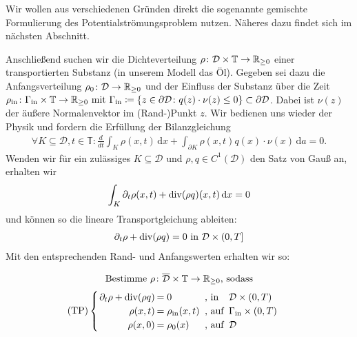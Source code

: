 \begin{Bemerkung}
	Wir wollen aus verschiedenen Gründen direkt die sogenannte gemischte Formulierung des Potentialströmungsproblem nutzen. Näheres dazu findet sich im nächsten Abschnitt.
\end{Bemerkung}
Anschließend suchen wir die Dichteverteilung $\rho\colon \mathcal{D} \times \mathbb{T} \rightarrow \mathbb{R}_{\geq0} $ einer transportierten Substanz (in unserem Modell das Öl).  \newline
Gegeben sei dazu die Anfangsverteilung $\rho_0\colon \mathcal{D} \rightarrow \mathbb{R}_{\geq0}$ und der Einfluss der Substanz über die Zeit
$
\rho_{\text{in}} \colon \Gamma_{\text{in}} \times \mathbb{T} \rightarrow \mathbb{R}_{\geq0} \text{ mit }  \Gamma_{\text{in}} \coloneqq  \{ z \in \partial \mathcal{D}\colon q(z)\cdot \nu(z) \leq 0 \} \subset  \partial \mathcal{D}
$.
Dabei ist $\nu(z)$ der äußere Normalenvektor im (Rand-)Punkt $z$.
Wir bedienen uns wieder der Physik und fordern die Erfüllung der Bilanzgleichung
\begin{align*}
\forall K \subseteq \mathcal{D} , t\in \mathbb{T} \colon \frac{d}{dt} \int_K \rho(x,t) \, \mathrm{d}x + \int_{\partial K} \rho(x,t)q(x)\cdot \nu(x) \, \mathrm{d}a = 0.
\end{align*}
Wenden wir für ein zulässiges $K \subseteq \mathcal{D}$ und $\rho,q \in C^1(\mathcal{D})$ den Satz von Gauß an, erhalten wir
\begin{align*}
\int_K \partial_t \rho(x,t) + \operatorname{div} (\rho q)(x,t) \, \mathrm{d}x = 0
\end{align*}
und können so die lineare Transportgleichung ableiten:
\begin{align*}
\partial_t \rho + \operatorname{div} (\rho q) = 0 \text{ in } \mathcal{D} \times (0,T]
\end{align*}
Mit den entsprechenden Rand- und Anfangswerten erhalten wir so:

\[ 
\text{Bestimme } \rho \colon \overline{\mathcal{D}} \times \mathbb{T} \to \R_{\geq 0} \text{, sodass} \newline \]
\[\setlength\arraycolsep{1pt}
\text{(TP)}\begin{cases} 
\begin{array}{rlll}
\partial_t \rho + \dive(\rho q) &= 0 &\text{ , in } &\mathcal{D} \times (0,T)\\
\rho(x,t) &= \rho_{\text{in}}(x,t) &\text{ , auf } &\Gamma_{\text{in}} \times (0,T)\\
\rho(x,0) &= \rho_0(x) &\text{ , auf } &\mathcal{D} \\
\end{array}
\end{cases} \\
\]

